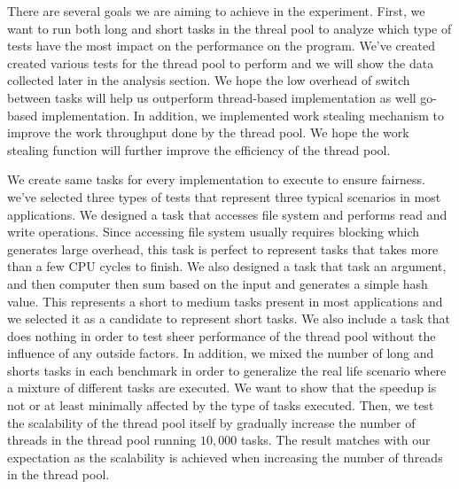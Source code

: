 \documentclass[journal, a4paper]{IEEEtran}
\begin{document}
There are several goals we are aiming to achieve in the experiment. First, we want to run both long and short tasks in the threal pool to analyze which type of tests have the most impact on the performance on the program. We've created created various tests for the thread pool to perform and we will show the data collected later in the analysis section. We hope the low overhead of switch between tasks will help us outperform thread-based implementation as well go-based implementation. In addition, we implemented work stealing mechanism to improve the work throughput done by the thread pool. We hope the work stealing function will further improve the efficiency of the thread pool. 	
	

We create same tasks for every implementation to execute to ensure fairness. we've selected three types of tests that represent three typical scenarios in most applications. We designed a task that accesses file system and performs read and write operations. Since accessing file system usually requires blocking which generates large overhead, this task is perfect to represent tasks that takes more than a few CPU cycles to finish. We also designed a task that task an argument, and then computer then sum based on the input and generates a simple hash value. This represents a short to medium tasks present in most applications and we selected it as a candidate to represent short tasks. We also include a task that does nothing in order to test sheer performance of the thread pool without the influence of any outside factors. In addition, we mixed the number of long and shorts tasks in each benchmark in order to generalize the real life scenario where a mixture of different tasks are executed. We want to show that the speedup is not or at least minimally affected by the type of tasks executed. Then, we test the scalability of the thread pool itself by gradually increase the number of threads in the thread pool running $10,000$ tasks. The result matches with our expectation as the scalability is achieved when increasing the number of threads in the thread pool.\\

\newpage
\end{document}

